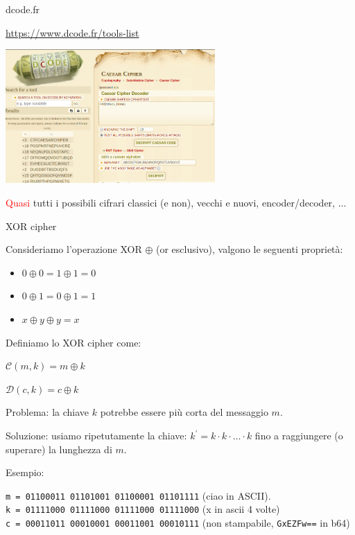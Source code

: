 \documentclass[handout, xcolor=dvipsnames,aspectratio=169]{beamer}
\begin{document}
\begin{frame}{dcode.fr}

\centering

\href{https://www.dcode.fr/tools-list}{https://www.dcode.fr/tools-list}

\medskip

\includegraphics[width=8cm]{img/dcode.png}

\medskip

\textcolor{red}{Quasi} tutti i possibili cifrari classici (e non), vecchi e nuovi, encoder/decoder, ...

\end{frame}


\begin{frame}{XOR cipher}

  Consideriamo l'operazione XOR $\oplus$ (or esclusivo), valgono le seguenti proprietà:
  
  \begin{itemize}
    \item $0 \oplus 0 = 1 \oplus 1 = 0$ 
    \item $0 \oplus 1 = 0 \oplus 1 = 1$ 
    \item $x \oplus y \oplus y = x$ 
  \end{itemize}
  
  \medskip
  \pause
  
  Definiamo lo XOR cipher come:
    
  $\mathcal{C}(m, k) = m \oplus k$ 
  
  $\mathcal{D}(c, k) = c \oplus k$

  \medskip
  
  \pause

  Problema: la chiave $k$ potrebbe essere più corta del messaggio $m$.
  
  Soluzione: usiamo ripetutamente la chiave: $k^{'} = k \cdot k \cdot \ldots \cdot k$ fino a raggiungere (o superare) la lunghezza di $m$.

  \medskip
  \pause
  
  Esempio:
  
  \texttt{m = 01100011 01101001 01100001 01101111} (ciao in ASCII).\\
  \texttt{k = 01111000 01111000 01111000 01111000} (x in ascii 4 volte)\\
  \texttt{c = 00011011 00010001 00011001 00010111} (non stampabile, \texttt{GxEZFw==} in b64)
  
  
\end{frame}
\end{document}
